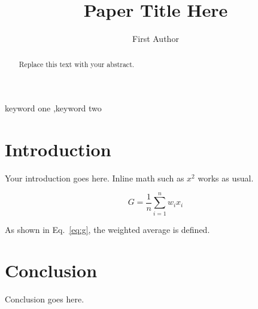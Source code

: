 \documentclass[preprint,12pt]{elsarticle}
\begin{document}
\begin{frontmatter}

\title{Paper Title Here}

\author[first]{First Author}

\begin{abstract}
Replace this text with your abstract.
\end{abstract}

\begin{keyword}
keyword one \sep keyword two
\end{keyword}

\end{frontmatter}

\section{Introduction}
Your introduction goes here. Inline math such as $x^2$ works as usual.

\begin{equation}
G = \frac{1}{n}\sum_{i=1}^{n} w_i x_i
\label{eq:g}
\end{equation}

As shown in Eq.~\ref{eq:g}, the weighted average is defined.

\section{Conclusion}
Conclusion goes here.
\end{document}
